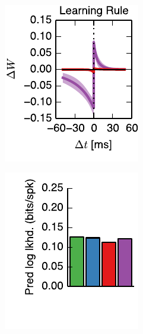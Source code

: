 \begin{figure}[t!]
\begin{subfigure}[T]{1.45in}
    \includegraphics[width=\textwidth]{figures/ch4/fig3_static_stdp_rule}    
    \label{fig:fig3_static_stdp_rule}
  \end{subfigure}
  \begin{subfigure}[T]{1.45in}
    \includegraphics[width=\textwidth]{figures/ch4/fig3_static_pred_ll}    

\end{subfigure}
\end{figure}
